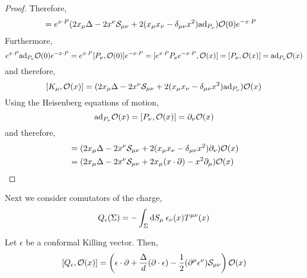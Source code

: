 \documentclass[12pt]{extarticle}
\begin{document}
\begin{proof}
Therefore,
\begin{align*}
[K_\mu, \Op(x)] & =  e^{x \cdot P} (2 x_\mu \Delta - 2 x^\nu \mathcal{S}_{\mu \nu} + 2 (x_\mu x_\nu - \delta_{\mu\nu} x^2) \ad{P_\nu}) \Op(0) e^{-x \cdot P}
\end{align*}
Furthermore,
\[ e^{x \cdot P} \mathrm{ad}_{P_\nu} \mathcal{O}(0) e^{-x \cdot P} = e^{x \cdot P} [P_\nu, \mathcal{O}(0)] e^{-x \cdot P} = [e^{x \cdot P} P_\nu e^{-x \cdot P}, \mathcal{O}(x)] = [P_\nu, \mathcal{O}(x)] = \mathrm{ad}_{P_\nu} \mathcal{O}(x) \]
and therefore,
\[ [K_\mu, \mathcal{O}(x)] = (2 x_\mu \Delta - 2 x^\nu \mathcal{S}_{\mu \nu} + 2 (x_\mu x_\nu - \delta_{\mu\nu} x^2) \mathrm{ad}_{P_\nu}) \mathcal{O}(x) \]
Using the Heisenberg equations of motion,
\[ \mathrm{ad}_{P_\nu} \mathcal{O}(x) = [P_{\nu}, \mathcal{O}(x)] = \partial_\nu \mathcal{O}(x) \]
and therefore, 
\begin{align*}
[K_\mu, \Op(x)] &= (2 x_\mu \Delta - 2 x^\nu \mathcal{S}_{\mu \nu} + 2 (x_\mu x_\nu - \delta_{\mu\nu} x^2) \partial_\nu) \Op(x) 
\\
& = (2 x_\mu \Delta - 2 x^\nu \mathcal{S}_{\mu \nu} + 2 x_\mu (x \cdot \partial) - x^2 \partial_\mu ) \Op(x) 
\end{align*}
\end{proof}
Next we consider comutators of the charge,
\[ Q_\epsilon(\Sigma) = - \int_{\Sigma} \mathrm{d}S_\mu \: \epsilon_\nu(x) T^{\mu\nu}(x) \]
\begin{theorem}
Let $\epsilon$ be a conformal Killing vector. Then,
\[ [Q_\epsilon, \mathcal{O}(x)] = \left( \epsilon \cdot \partial + \frac{\Delta}{d} (\partial \cdot \epsilon) - \frac{1}{2} (\partial^\mu \epsilon^\nu) \mathcal{S}_{\mu\nu} \right) \mathcal{O}(x) \]
\end{theorem}
\end{document}
